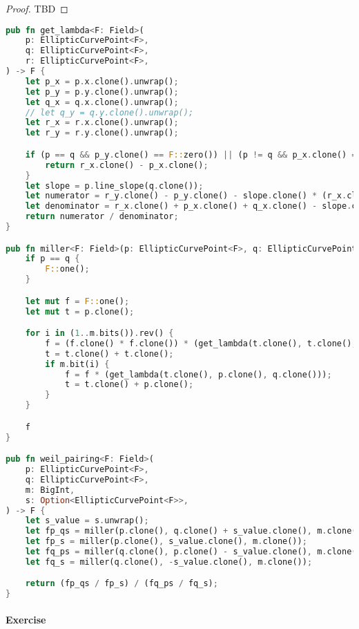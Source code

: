 \documentclass{article}
\begin{document}
\begin{proof}
    TBD
\end{proof}

\begin{lstlisting}[language=Rust, caption=Implementation of the Weil Pairing]
pub fn get_lambda<F: Field>(
    p: EllipticCurvePoint<F>,
    q: EllipticCurvePoint<F>,
    r: EllipticCurvePoint<F>,
) -> F {
    let p_x = p.x.clone().unwrap();
    let p_y = p.y.clone().unwrap();
    let q_x = q.x.clone().unwrap();
    // let q_y = q.y.clone().unwrap();
    let r_x = r.x.clone().unwrap();
    let r_y = r.y.clone().unwrap();

    if (p == q && p_y.clone() == F::zero()) || (p != q && p_x.clone() == q_x.clone()) {
        return r_x.clone() - p_x.clone();
    }
    let slope = p.line_slope(q.clone());
    let numerator = r_y.clone() - p_y.clone() - slope.clone() * (r_x.clone() - p_x.clone());
    let denominator = r_x.clone() + p_x.clone() + q_x.clone() - slope.clone() * slope.clone();
    return numerator / denominator;
}

pub fn miller<F: Field>(p: EllipticCurvePoint<F>, q: EllipticCurvePoint<F>, m: BigInt) -> F {
    if p == q {
        F::one();
    }

    let mut f = F::one();
    let mut t = p.clone();

    for i in (1..m.bits()).rev() {
        f = (f.clone() * f.clone()) * (get_lambda(t.clone(), t.clone(), q.clone()));
        t = t.clone() + t.clone();
        if m.bit(i) {
            f = f * (get_lambda(t.clone(), p.clone(), q.clone()));
            t = t.clone() + p.clone();
        }
    }

    f
}

pub fn weil_pairing<F: Field>(
    p: EllipticCurvePoint<F>,
    q: EllipticCurvePoint<F>,
    m: BigInt,
    s: Option<EllipticCurvePoint<F>>,
) -> F {
    let s_value = s.unwrap();
    let fp_qs = miller(p.clone(), q.clone() + s_value.clone(), m.clone());
    let fp_s = miller(p.clone(), s_value.clone(), m.clone());
    let fq_ps = miller(q.clone(), p.clone() - s_value.clone(), m.clone());
    let fq_s = miller(q.clone(), -s_value.clone(), m.clone());

    return (fp_qs / fp_s) / (fq_ps / fq_s);
}
\end{lstlisting}

\paragraph{Exercise}
\end{document}
